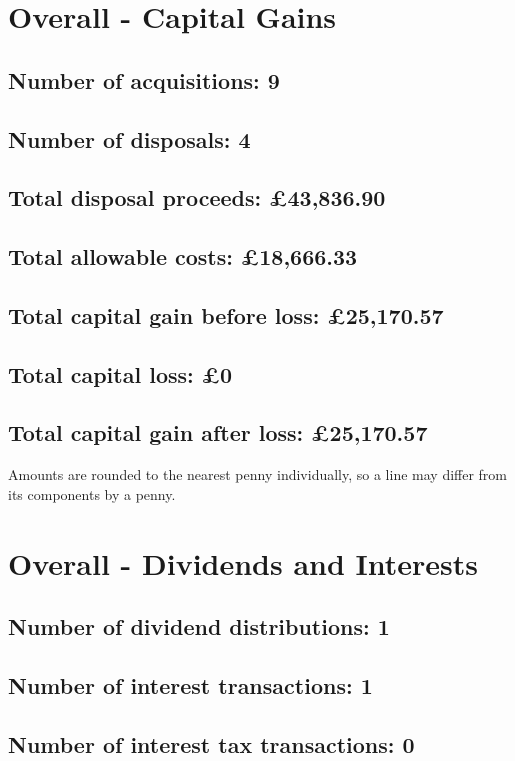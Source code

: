 \documentclass{article}
\begin{document}
\clearpage
\section*{Overall - Capital Gains}
\subsection*{Number of acquisitions: 9}
\subsection*{Number of disposals: 4}
\subsection*{Total disposal proceeds: £43,836.90}
\subsection*{Total allowable costs: £18,666.33}
\subsection*{Total capital gain before loss: £25,170.57}
\subsection*{Total capital loss: £0}
\subsection*{Total capital gain after loss: £25,170.57}
\vspace{1em}
Amounts are rounded to the nearest penny individually, so a line may differ from its components by a penny.
\vspace{2em}
\section*{Overall - Dividends and Interests}
\subsection*{Number of dividend distributions: 1}
\subsection*{Number of interest transactions: 1}
\subsection*{Number of interest tax transactions: 0}
\end{document}
